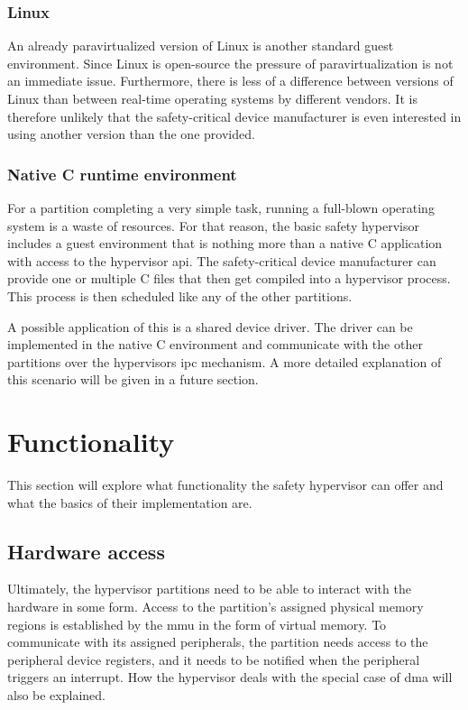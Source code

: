 \subsubsection{Linux}
An already paravirtualized version of Linux is another standard guest environment. Since Linux is open-source the pressure of paravirtualization is not an immediate issue. Furthermore, there is less of a difference between versions of Linux than between real-time operating systems by different vendors. It is therefore unlikely that the safety-critical device manufacturer is even interested in using another version than the one provided.

\subsubsection{Native C runtime environment}
For a partition completing a very simple task, running a full-blown operating system is a waste of resources. For that reason, the basic safety hypervisor includes a guest environment that is nothing more than a native C application with access to the hypervisor \acrshort{api}. The safety-critical device manufacturer can provide one or multiple C files that then get compiled into a hypervisor process. This process is then scheduled like any of the other partitions.

A possible application of this is a shared device driver. The driver can be implemented in the native C environment and communicate with the other partitions over the hypervisors \acrshort{ipc} mechanism. A more detailed explanation of this scenario will be given in a future section.


\section{Functionality}
This section will explore what functionality the safety hypervisor can offer and what the basics of their implementation are.
\subsection{Hardware access}
Ultimately, the hypervisor partitions need to be able to interact with the hardware in some form. Access to the partition's assigned physical memory regions is established by the \acrshort{mmu} in the form of virtual memory.
To communicate with its assigned peripherals, the partition needs access to the peripheral device registers, and it needs to be notified when the peripheral triggers an interrupt. How the hypervisor deals with the special case of \acrfull{dma} will also be explained.

